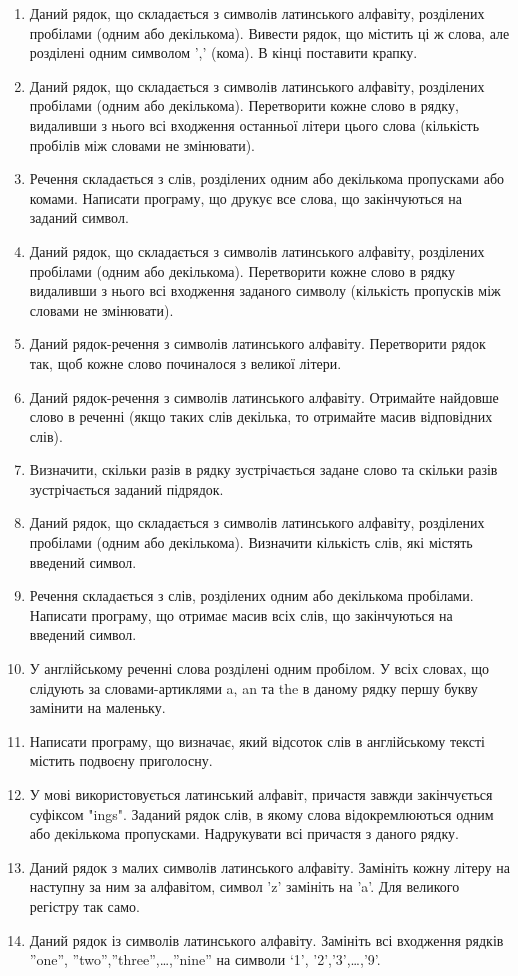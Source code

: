 \documentclass[a5paper,titlepage,openany,twoside,
]
{book_unv}%
\begin{document}
\begin{enumerate}
\begin{enumerate}
\def\labelenumi{\arabic{enumi})}
\setcounter{enumi}{6}
\item
  Даний рядок, що складається з символів латинського алфавіту,
  розділених пробілами (одним або декількома). Вивести рядок, що містить
  ці ж слова, але розділені одним символом ',' (кома). В кінці
  поставити крапку.
\item
  Даний рядок, що складається з символів латинського алфавіту,
  розділених пробілами (одним або декількома). Перетворити кожне слово в
  рядку, видаливши з нього всі входження останньої літери цього слова
  (кількість пробілів між словами не змінювати).
\item
  Речення складається з слів, розділених одним або декількома
  пропусками або комами. Написати програму, що друкує все слова, що закінчуються на
  заданий символ.
\item
  Даний рядок, що складається з символів латинського алфавіту,
  розділених пробілами (одним або декількома). Перетворити кожне слово в
  рядку видаливши з нього всі входження заданого символу (кількість
  пропусків між словами не змінювати).
\item
  Даний рядок-речення з символів латинського алфавіту. Перетворити рядок
  так, щоб кожне слово починалося з великої літери.
\item
  Даний рядок-речення з символів латинського алфавіту. Отримайте найдовше
  слово в реченні (якщо таких слів декілька, то отримайте масив відповідних слів).
\item
  Визначити, скільки разів в рядку зустрічається задане слово та скільки разів 
зустрічається заданий підрядок.
\item
  Даний рядок, що складається з символів латинського алфавіту,
  розділених пробілами (одним або декількома). Визначити кількість слів,
  які містять введений символ.
\item
  Речення складається з слів, розділених одним або декількома
  пробілами. Написати програму, що отримає масив всіх слів, що закінчуються на
  введений символ.
\item
  У англійському реченні слова розділені одним пробілом. У всіх словах, що 
слідують за словами-артиклями a, an та the в даному рядку першу букву замінити на маленьку.

\item
  Написати програму, що визначає, який відсоток слів в англійському
  тексті містить подвоєну приголосну.
\item
  У мові використовується латинський алфавіт, причастя завжди
  закінчується суфіксом "ings". Заданий рядок слів, в якому слова
  відокремлюються одним або декількома пропусками. Надрукувати всі причастя
  з даного рядку.
\item
  Даний рядок з малих символів латинського алфавіту. Замініть кожну літеру
  на наступну за ним за алфавітом, символ 'z' замініть на 'a'. Для великого
регістру так само.
\item
  Даний рядок із символів латинського алфавіту. Замініть всі входження
  рядків ''one'', ''two'',''three'',\ldots{},''nine'' на символи `1',
  '2','3',\ldots{},'9'.


\end{enumerate}
\end{enumerate}
\end{document}

